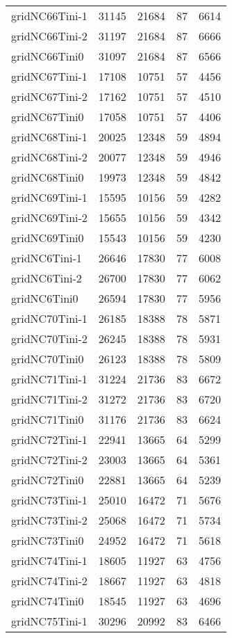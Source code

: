 \begin{tabular}{lrrrr}
gridNC66Tini-1 & 31145 & 21684 & 87 & 6614 \\
gridNC66Tini-2 & 31197 & 21684 & 87 & 6666 \\
gridNC66Tini0 & 31097 & 21684 & 87 & 6566 \\
gridNC67Tini-1 & 17108 & 10751 & 57 & 4456 \\
gridNC67Tini-2 & 17162 & 10751 & 57 & 4510 \\
gridNC67Tini0 & 17058 & 10751 & 57 & 4406 \\
gridNC68Tini-1 & 20025 & 12348 & 59 & 4894 \\
gridNC68Tini-2 & 20077 & 12348 & 59 & 4946 \\
gridNC68Tini0 & 19973 & 12348 & 59 & 4842 \\
gridNC69Tini-1 & 15595 & 10156 & 59 & 4282 \\
gridNC69Tini-2 & 15655 & 10156 & 59 & 4342 \\
gridNC69Tini0 & 15543 & 10156 & 59 & 4230 \\
gridNC6Tini-1 & 26646 & 17830 & 77 & 6008 \\
gridNC6Tini-2 & 26700 & 17830 & 77 & 6062 \\
gridNC6Tini0 & 26594 & 17830 & 77 & 5956 \\
gridNC70Tini-1 & 26185 & 18388 & 78 & 5871 \\
gridNC70Tini-2 & 26245 & 18388 & 78 & 5931 \\
gridNC70Tini0 & 26123 & 18388 & 78 & 5809 \\
gridNC71Tini-1 & 31224 & 21736 & 83 & 6672 \\
gridNC71Tini-2 & 31272 & 21736 & 83 & 6720 \\
gridNC71Tini0 & 31176 & 21736 & 83 & 6624 \\
gridNC72Tini-1 & 22941 & 13665 & 64 & 5299 \\
gridNC72Tini-2 & 23003 & 13665 & 64 & 5361 \\
gridNC72Tini0 & 22881 & 13665 & 64 & 5239 \\
gridNC73Tini-1 & 25010 & 16472 & 71 & 5676 \\
gridNC73Tini-2 & 25068 & 16472 & 71 & 5734 \\
gridNC73Tini0 & 24952 & 16472 & 71 & 5618 \\
gridNC74Tini-1 & 18605 & 11927 & 63 & 4756 \\
gridNC74Tini-2 & 18667 & 11927 & 63 & 4818 \\
gridNC74Tini0 & 18545 & 11927 & 63 & 4696 \\
gridNC75Tini-1 & 30296 & 20992 & 83 & 6466 \\

\end{tabular}
